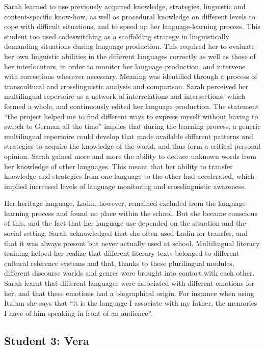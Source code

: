 \documentclass[output=paper]{../langscibook}
\begin{document}
Sarah learned to use previously acquired knowledge, strategies, linguistic and content-specific know-how, as well as procedural knowledge on different levels to cope with difficult situations, and to speed up her language-learning process. This student too used codeswitching as a scaffolding strategy in linguistically demanding situations during language production. This required her to evaluate her own linguistic abilities in the different languages correctly as well as those of her interlocutors, in order to monitor her language production, and intervene with corrections wherever necessary. Meaning was identified through a process of transcultural and crosslinguistic analysis and comparison. Sarah perceived her multilingual repertoire as a network of interrelations and intersections, which formed a whole, and continuously edited her language production. The statement “the project helped me to find different ways to express myself without having to switch to German all the time” implies that  during the learning process, a generic multilingual repertoire could develop that made available different patterns and strategies to acquire the knowledge of the world, and thus form a critical personal opinion. Sarah gained more and more the ability to deduce unknown words from her knowledge of other languages. This meant that her ability to transfer knowledge and strategies from one language to the other had accelerated, which implied increased levels of language monitoring and crosslinguistic awareness. 

Her heritage language, Ladin, however, remained excluded from the language-learning process and found no place within the school. But she became conscious of this, and the fact that her language use depended on the situation and the social setting. Sarah acknowledged that she often used Ladin for transfer, and that it was always present but never actually used at school. Multilingual literacy training helped her realize that different literary texts belonged to different cultural reference systems and that, thanks to these plurilingual modules, different discourse worlds and genres were brought into contact with each other. Sarah learnt that different languages were associated with different emotions for her, and that these emotions had a biographical origin. For instance when using Italian she says that “it is the language I associate with my father, the memories I have of him speaking in front of an audience”.

\subsection{Student 3: Vera}
\end{document}
